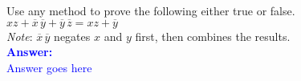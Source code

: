 \item{}
Use any method to prove the following either true or false.\\[6pt]
$xz+\overline{x}\,\overline{y}+\overline{y}\,\overline{z}=xz+\overline{y}$\\[6pt]
\emph{Note}\/: $\overline{x}\,\overline{y}$ negates $x$ and $y$ first, then
combines the results.\\[12pt]
\ifanswers
\textcolor{blue}{
\textbf{Answer:}\\
Answer goes here
}
\newpage
\fi

